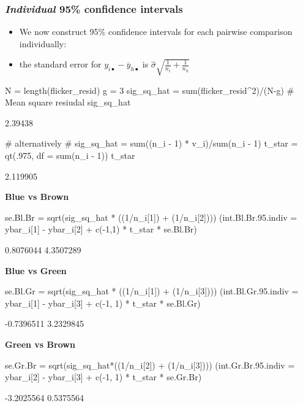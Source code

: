 \documentclass[a4paper]{article}
\begin{document}
\subsubsection{\textit{Individual} 95\% confidence intervals}
\begin{itemize}
	\item We now construct 95\% confidence intervals for each pairwise comparison individually:
	\item the standard error for \( y_{i\bullet} - \overline{y}_{h\bullet} \) is \( \hat{\sigma} \sqrt{\frac{1}{n_i} + \frac{1}{n_h}} \)  
\end{itemize}
\begin{Schunk}
\begin{Sinput}
N = length(flicker_resid)
g = 3
sig_sq_hat = sum(flicker_resid^2)/(N-g) # Mean square resiudal
sig_sq_hat
\end{Sinput}
\begin{Soutput}
[1] 2.39438
\end{Soutput}
\begin{Sinput}
# alternatively
# sig_sq_hat = sum((n_i - 1) * v_i)/sum(n_i - 1)
t_star = qt(.975, df = sum(n_i - 1))
t_star
\end{Sinput}
\begin{Soutput}
[1] 2.119905
\end{Soutput}
\end{Schunk}
\textbf{Blue vs Brown}
\begin{Schunk}
\begin{Sinput}
se.Bl.Br = sqrt(sig_sq_hat * ((1/n_i[1]) + (1/n_i[2])))
(int.Bl.Br.95.indiv = ybar_i[1] - ybar_i[2] + c(-1,1) * t_star * se.Bl.Br)
\end{Sinput}
\begin{Soutput}
[1] 0.8076044 4.3507289
\end{Soutput}
\end{Schunk}
\textbf{Blue vs Green}
\begin{Schunk}
\begin{Sinput}
se.Bl.Gr = sqrt(sig_sq_hat * ((1/n_i[1]) + (1/n_i[3])))
(int.Bl.Gr.95.indiv = ybar_i[1] - ybar_i[3] + c(-1, 1) * t_star * se.Bl.Gr)
\end{Sinput}
\begin{Soutput}
[1] -0.7396511  3.2329845
\end{Soutput}
\end{Schunk}
\textbf{Green vs Brown}
\begin{Schunk}
\begin{Sinput}
se.Gr.Br = sqrt(sig_sq_hat*((1/n_i[2]) + (1/n_i[3])))
(int.Gr.Br.95.indiv = ybar_i[2] - ybar_i[3] + c(-1, 1) * t_star * se.Gr.Br)
\end{Sinput}
\begin{Soutput}
[1] -3.2025564  0.5375564
\end{Soutput}
\end{Schunk}
\end{document}
